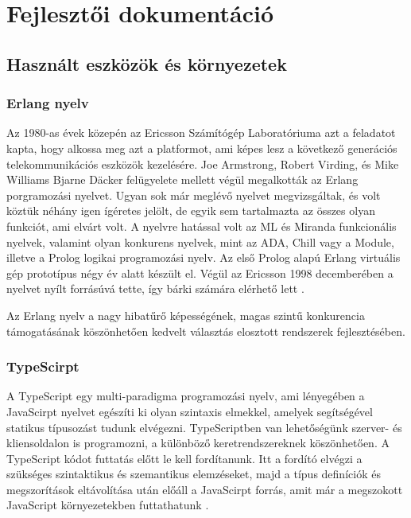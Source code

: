 

\chapter{Fejlesztői dokumentáció}
\label{ch:impl}


\section{Használt eszközök és környezetek} \label{usedTechnologies}
\subsection{Erlang nyelv}
Az 1980-as évek közepén az Ericsson Számítógép Laboratóriuma azt a feladatot kapta, hogy alkossa meg azt a platformot, ami képes lesz a következő generációs telekommunikációs eszközök kezelésére. Joe Armstrong, Robert Virding, és Mike Williams Bjarne Däcker felügyelete mellett végül megalkották az Erlang porgramozási nyelvet. Ugyan sok már meglévő nyelvet megvizsgáltak, és volt köztük néhány igen ígéretes jelölt, de egyik sem tartalmazta az összes olyan funkciót, ami elvárt volt. A nyelvre hatással volt az ML és Miranda funkcionális nyelvek, valamint olyan konkurens nyelvek, mint az ADA, Chill vagy a Module, illetve a Prolog logikai programozási nyelv. Az első Prolog alapú Erlang virtuális gép prototípus négy év alatt készült el. Végül az Ericsson 1998 decemberében a nyelvet nyílt forrásúvá tette, így bárki számára elérhető lett \cite{erlangBook}.

Az Erlang nyelv a nagy hibatűrő képességének, magas szintű konkurencia támogatásának köszönhetően kedvelt választás elosztott rendszerek fejlesztésében.


\subsection{TypeScirpt}

A TypeScript egy multi-paradigma programozási nyelv, ami lényegében a JavaScirpt nyelvet egészíti ki olyan szintaxis elmekkel, amelyek segítségével statikus típusozást tudunk elvégezni. TypeScriptben van lehetőségünk szerver- és kliensoldalon is programozni, a különböző keretrendszereknek köszönhetően. A TypeScript kódot futtatás előtt le kell fordítanunk. Itt a fordító elvégzi a szükséges szintaktikus és szemantikus elemzéseket, majd a típus definíciók és megszorítások eltávolítása után előáll a JavaScirpt forrás, amit már a megszokott JavaScript környezetekben futtathatunk \cite{webpageTS} \cite{wikipediaTS}.

